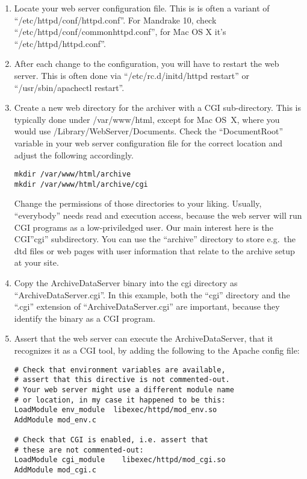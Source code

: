 \begin{enumerate}
\item Locate your web server configuration file. This is is often 
  a variant of ``/etc/httpd/conf/httpd.conf''. For Mandrake 10, check
  ``/etc/httpd/conf/commonhttpd.conf'',
  for Mac OS X it's ``/etc/httpd/httpd.conf''.
\item After each change to the configuration, you will have to restart the
 web server. This is often done via 
``/etc/rc.d/initd/httpd restart''
or
``/usr/sbin/apachectl restart''.
\item Create a new web directory for the archiver with a CGI
   sub-directory. This is typically done under /var/www/html,
   except for Mac OS~X, where you would use /Library/WebServer/Documents.
   Check the ``DocumentRoot'' variable in your web server configuration file
   for the correct location and adjust the following accordingly.
\begin{lstlisting}[keywordstyle=\sffamily]
mkdir /var/www/html/archive
mkdir /var/www/html/archive/cgi
\end{lstlisting}
   Change the permissions of those directories to your liking.
   Usually, ``everybody'' needs read and execution access, because
   the web server will run CGI programs as a low-priviledged user. 
   Our main interest here is the CGI''cgi'' subdirectory.
   You can use the ``archive'' directory to store e.g.\ the dtd files
   or web pages with user information that relate to the archive setup
   at your site.
\item Copy the ArchiveDataServer binary into the cgi directory as
  ``ArchiveDataServer.cgi''.
   In this example, both the ``cgi'' directory and the ``.cgi''
   extension of ``ArchiveDataServer.cgi'' are important,
   because they identify the binary as a CGI program.
\item Assert that the web server can execute the ArchiveDataServer,
   that it recognizes it as a CGI tool, by
   adding the following to the Apache config file:
\begin{lstlisting}[keywordstyle=\sffamily]
# Check that environment variables are available,
# assert that this directive is not commented-out.
# Your web server might use a different module name
# or location, in my case it happened to be this:
LoadModule env_module  libexec/httpd/mod_env.so
AddModule mod_env.c

# Check that CGI is enabled, i.e. assert that
# these are not commented-out:
LoadModule cgi_module    libexec/httpd/mod_cgi.so
AddModule mod_cgi.c


\end{lstlisting}
\end{enumerate}

